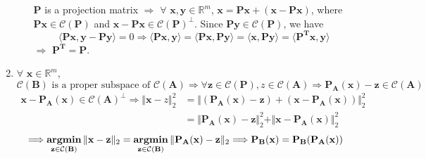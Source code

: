 \documentclass[11pt,letter,notitlepage]{article}
\DeclareMathOperator*{\argmin}{\bf argmin}
\newcommand{\proj}[2]{\textbf{P}_{#2} (#1)}
\theoremstyle{definition}
\begin{document}
\begin{solution}
\begin{enumerate}
\begin{enumerate}
		$\mathbf{P}$ is a projection matrix $\Longrightarrow$ $\forall$ $\mathbf{x}, \mathbf{y} \in \mathbb{R}^m$, $\mathbf{x} = \mathbf{Px} + (\mathbf{x-Px})$, where $\mathbf{Px} \in \mathcal{C}(\mathbf{P})$ and $\mathbf{x-Px} \in \mathcal{C}(\mathbf{P})^{\perp}$. Since $\mathbf{Py} \in \mathcal{C}(\mathbf{P})$, we have
		\[
		\langle \mathbf{Px}, \mathbf{y} - \mathbf{Py} \rangle
		=
		0
		\Longrightarrow
		\langle \mathbf{Px}, \mathbf{y} \rangle
		=
		\langle \mathbf{Px}, \mathbf{Py} \rangle
		=
		\langle \mathbf{x}, \mathbf{Py} \rangle
		=
		\langle \mathbf{P^T x}, \mathbf{y} \rangle
		\]
		$\Longrightarrow$ $\mathbf{P^T} = \mathbf{P}$.
	\end{enumerate}
	\item $\forall$ $\mathbf{x} \in \mathbb{R}^m$,
	\[
	\mathcal{C}(\mathbf{B}) \text{ is a proper subspace of } \mathcal{C}(\mathbf{A})
	\Longrightarrow
	\forall \mathbf{z}\in\mathcal{C}(\mathbf{P}), z\in\mathcal{C}(\mathbf{A})
	\Longrightarrow
	\proj{\mathbf{x}}{\mathbf{A}} - \mathbf{z} \in \mathcal{C}(\mathbf{A})
	\]
	\begin{align*}
	\mathbf{x} - \proj{\mathbf{x}}{\mathbf{A}} \in \mathcal{C}(\mathbf{A})^{\perp}
	\Longrightarrow
	\Vert \mathbf{x} - z \Vert_2^2
	&=
	\Vert (\proj{\mathbf{x}}{\mathbf{A}} - \mathbf{z}) + \left(\mathbf{x}-\proj{\mathbf{x}}{\mathbf{A}}\right) \Vert_2^2\\
	&=
	\Vert \proj{\mathbf{x}}{\mathbf{A}} - \mathbf{z} \Vert_2^2
	+
	\Vert \mathbf{x}-\proj{\mathbf{x}}{\mathbf{A}} \Vert_2^2
	\end{align*}
	\[
	\Longrightarrow
	\argmin_{\mathbf{z} \in \mathcal{C}(\mathbf{B})} \Vert \mathbf{x} - \mathbf{z} \Vert_2
	=
	\argmin_{\mathbf{z} \in \mathcal{C}(\mathbf{B})} \Vert \proj{\mathbf{x}}{\mathbf{A}} - \mathbf{z} \Vert_2
	\Longrightarrow
	\proj{\mathbf{x}}{\mathbf{B}}
	=
	\proj{\proj{\mathbf{x}}{\mathbf{A}}}{\mathbf{B}}
	\]
\end{enumerate}
\end{solution}
\end{document}
